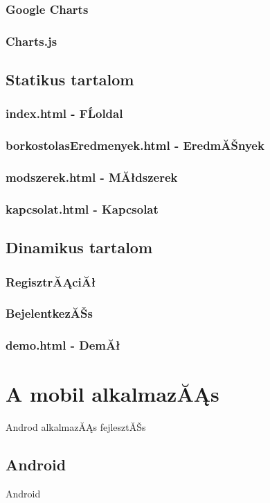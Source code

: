 \documentclass[12pt]{report}
\theoremstyle{definition}
\begin{document}
\subsection{Google Charts}
\subsection{Charts.js}

\section{Statikus tartalom}
\subsection{index.html - FĹoldal}
\subsection{borkostolasEredmenyek.html - EredmĂŠnyek}
\subsection{modszerek.html - MĂłdszerek}
\subsection{kapcsolat.html - Kapcsolat}

\section{Dinamikus tartalom}
\subsection{RegisztrĂĄciĂł}
\subsection{BejelentkezĂŠs}
\subsection{demo.html - DemĂł}

\chapter{A mobil alkalmazĂĄs}
Androd alkalmazĂĄs fejlesztĂŠs

\section{Android}
Android
\end{document}
